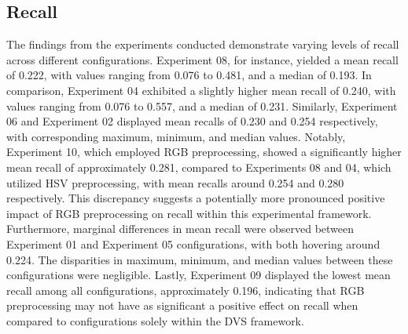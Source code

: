 \documentclass[sigchi,screen]{acmart}
\begin{document}
\subsection{Recall}
The findings from the experiments conducted demonstrate varying levels of recall across different configurations. Experiment 08, for instance, yielded a mean recall of 0.222, with values ranging from 0.076 to 0.481, and a median of 0.193. In comparison, Experiment 04 exhibited a slightly higher mean recall of 0.240, with values ranging from 0.076 to 0.557, and a median of 0.231. Similarly, Experiment 06 and Experiment 02 displayed mean recalls of 0.230 and 0.254 respectively, with corresponding maximum, minimum, and median values. Notably, Experiment 10, which employed RGB preprocessing, showed a significantly higher mean recall of approximately 0.281, compared to Experiments 08 and 04, which utilized HSV preprocessing, with mean recalls around 0.254 and 0.280 respectively. This discrepancy suggests a potentially more pronounced positive impact of RGB preprocessing on recall within this experimental framework. Furthermore, marginal differences in mean recall were observed between Experiment 01 and Experiment 05 configurations, with both hovering around 0.224. The disparities in maximum, minimum, and median values between these configurations were negligible. Lastly, Experiment 09 displayed the lowest mean recall among all configurations, approximately 0.196, indicating that RGB preprocessing may not have as significant a positive effect on recall when compared to configurations solely within the DVS framework.

\end{document}
